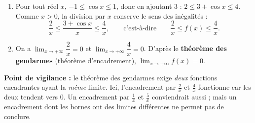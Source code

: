 \documentclass[11pt]{article}
\begin{document}
\begin{corrige}
\begin{enumerate}
\item Pour tout réel $x$, $-1\leq\cos x\leq 1$, donc en ajoutant $3$ : $2\leq 3+\cos x\leq 4$. Comme $x>0$, la division par $x$ conserve le sens des inégalités :
\[ \dfrac{2}{x}\leq \dfrac{3+\cos x}{x}\leq \dfrac{4}{x}, \qquad\text{c'est-à-dire}\qquad \dfrac{2}{x}\leq f(x)\leq\dfrac{4}{x}. \]
\item On a $\displaystyle\lim_{x\to+\infty}\dfrac{2}{x}=0$ et $\displaystyle\lim_{x\to+\infty}\dfrac{4}{x}=0$. D'après le \textbf{théorème des gendarmes} (théorème d'encadrement), $\displaystyle\lim_{x\to+\infty}f(x)=0$.
\end{enumerate}
\textbf{Point de vigilance :} le théorème des gendarmes exige \emph{deux} fonctions encadrantes ayant la \emph{même} limite. Ici, l'encadrement par $\frac{2}{x}$ et $\frac{4}{x}$ fonctionne car les deux tendent vers $0$. Un encadrement par $\frac{1}{x}$ et $\frac{5}{x}$ conviendrait aussi ; mais un encadrement dont les bornes ont des limites différentes ne permet pas de conclure.
\end{corrige}
\end{document}
